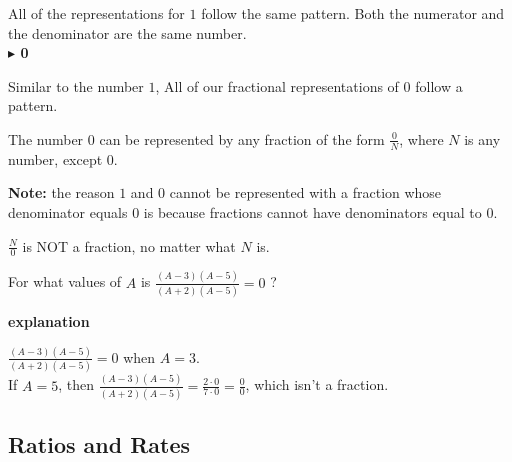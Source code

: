 \documentclass{ximera}
\begin{document}
All of the representations for $1$ follow the same pattern.  Both the numerator and the denominator are the same number. \\




\textbf{\textcolor{purple!85!blue}{$\blacktriangleright$ 0}} 


Similar to the number $1$, All of our fractional representations of $0$ follow a pattern.






\begin{idea}

The number $0$ can be represented by any fraction of the form $\frac{0}{N}$, where $N$ is any number, except $0$.


\end{idea}

\textbf{Note:} the reason $1$ and $0$ cannot be represented with a fraction whose denominator equals $0$ is because fractions cannot have denominators equal to $0$.






\begin{warning}


$\frac{N}{0}$ is NOT a fraction, no matter what $N$ is.



\end{warning}




\begin{example}


For what values of $A$ is  $\frac{(A-3)(A-5)}{(A+2)(A-5)} = 0$ ?


\textbf{explanation}

$\frac{(A-3)(A-5)}{(A+2)(A-5)} = 0$ when $A = 3$. \\


If $A = 5$, then $\frac{(A-3)(A-5)}{(A+2)(A-5)} = \frac{2\cdot0}{7\cdot0} = \frac{0}{0}$, which isn't a fraction.






\end{example}


\newpage

\subsection*{Ratios and Rates}

\hfill\break
\end{document}

